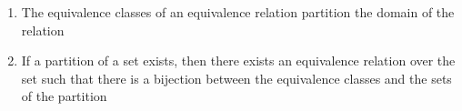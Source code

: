 \documentclass{article}
\begin{document}
\begin{enumerate}
\item The equivalence classes of an equivalence relation partition the domain of
the relation

\item If a partition of a set exists, then there exists an equivalence relation
over the set such that there is a bijection between the equivalence classes and
the sets of the partition
\end{enumerate}
\end{document}
